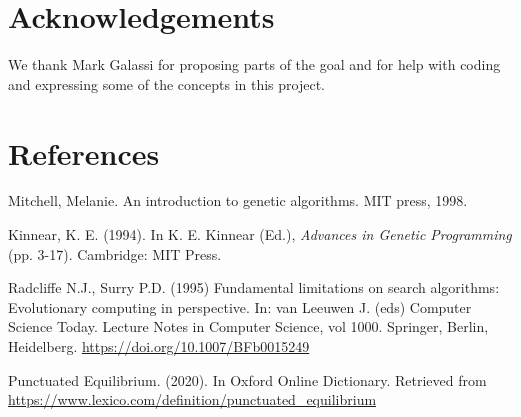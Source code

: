 \documentclass[11pt]{article}
\begin{document}

\restoregeometry

\section*{Acknowledgements}

We thank Mark Galassi for proposing parts of the goal and for help
with coding and expressing some of the concepts in this project.

\section*{References}
\label{sec:org9dc046e}
\doublespacing

Mitchell, Melanie. An introduction to genetic algorithms. MIT press, 1998.

Kinnear, K. E. (1994). In K. E. Kinnear (Ed.), \emph{Advances in
Genetic Programming} (pp. 3-17). Cambridge: MIT Press.

Radcliffe N.J., Surry P.D. (1995) Fundamental limitations on search
algorithms: Evolutionary computing in perspective.  In: van Leeuwen
J. (eds) Computer Science Today. Lecture Notes in Computer Science,
vol 1000. Springer, Berlin, Heidelberg.
\url{https://doi.org/10.1007/BFb0015249}

Punctuated Equilibrium. (2020). In Oxford Online Dictionary. Retrieved
from \url{https://www.lexico.com/definition/punctuated_equilibrium}
\end{document}

